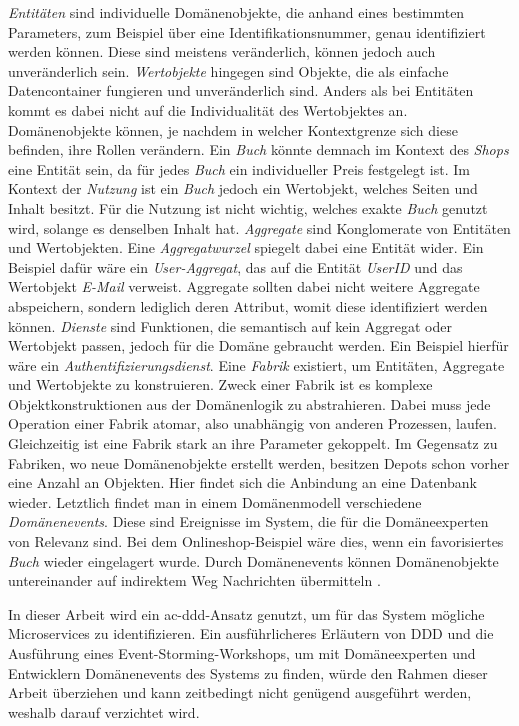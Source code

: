     \emph{Entitäten} sind individuelle Domänenobjekte, die anhand eines bestimmten Parameters, zum Beispiel über eine Identifikationsnummer, genau identifiziert werden können. Diese sind meistens veränderlich, können jedoch auch unveränderlich sein. \emph{Wertobjekte} hingegen sind Objekte, die als einfache Datencontainer fungieren und unveränderlich sind. Anders als bei Entitäten kommt es dabei nicht auf die Individualität des Wertobjektes an. Domänenobjekte können, je nachdem in welcher Kontextgrenze sich diese befinden, ihre Rollen verändern. Ein \emph{Buch} könnte demnach im Kontext des \emph{Shops} eine Entität sein, da für jedes \emph{Buch} ein individueller Preis festgelegt ist. Im Kontext der \emph{Nutzung} ist ein \emph{Buch} jedoch ein Wertobjekt, welches Seiten und Inhalt besitzt. Für die Nutzung ist nicht wichtig, welches exakte \emph{Buch} genutzt wird, solange es denselben Inhalt hat. \emph{Aggregate} sind Konglomerate von Entitäten und Wertobjekten. Eine \emph{Aggregatwurzel} spiegelt dabei eine Entität wider. Ein Beispiel dafür wäre ein \emph{User-Aggregat}, das auf die Entität \emph{UserID} und das Wertobjekt \emph{E-Mail} verweist. Aggregate sollten dabei nicht weitere Aggregate abspeichern, sondern lediglich deren Attribut, womit diese identifiziert werden können. \emph{Dienste} sind Funktionen, die semantisch auf kein Aggregat oder Wertobjekt passen, jedoch für die Domäne gebraucht werden. Ein Beispiel hierfür wäre ein \emph{Authentifizierungsdienst}. Eine \emph{Fabrik} existiert, um Entitäten, Aggregate und Wertobjekte zu konstruieren. Zweck einer Fabrik ist es komplexe Objektkonstruktionen aus der Domänenlogik zu abstrahieren. Dabei muss jede Operation einer Fabrik atomar, also unabhängig von anderen Prozessen, laufen. Gleichzeitig ist eine Fabrik stark an ihre Parameter gekoppelt. Im Gegensatz zu Fabriken, wo neue Domänenobjekte erstellt werden, besitzen Depots schon vorher eine Anzahl an Objekten. Hier findet sich die Anbindung an eine Datenbank wieder. Letztlich findet man in einem Domänenmodell verschiedene \emph{Domänenevents}. Diese sind Ereignisse im System, die für die Domäneexperten von Relevanz sind. Bei dem Onlineshop-Beispiel wäre dies, wenn ein favorisiertes \emph{Buch} wieder eingelagert wurde. Durch Domänenevents können Domänenobjekte untereinander auf indirektem Weg Nachrichten übermitteln \parencites[S. 2--4, S. 89--108, S. 136--154]{evans2004domain}[S. 265--286, S.347--362, S. 389--401]{vernon2013implementing}{vernon2016domain}.

    In dieser Arbeit wird ein \gls{ac-ddd}-Ansatz genutzt, um für das System mögliche Microservices zu identifizieren. Ein ausführlicheres Erläutern von DDD und die Ausführung eines Event-Storming-Workshops, um mit Domäneexperten und Entwicklern Domänenevents des Systems zu finden, würde den Rahmen dieser Arbeit überziehen und kann zeitbedingt nicht genügend ausgeführt werden, weshalb darauf verzichtet wird.
